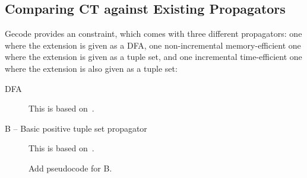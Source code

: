 \documentclass[a4paper,11pt]{article}
\newcommand{\Todo}[1]{{\color{blue}#1}}
\newcommand{\Algoref}[1]{Algorithm~\ref{#1}}
\numberwithin{equation}{section}
\begin{document}
\subsection{Comparing CT against Existing Propagators}

Gecode provides an  constraint, which
comes with three different propagators: one where the extension
is given as a DFA, one non-incremental memory-efficient one where
the extension is given as a tuple set, and one incremental
time-efficient one where the extension is also given as a tuple set:

\begin{description}
  \item[DFA] This is based on~\cite{Pesant:seqs}.
  \item[B -- Basic positive tuple set propagator]
    This is based on~\cite{DBLP:journals/ai/BessiereRYZ05}.

    \Todo{Add pseudocode for B}.





\end{description}
\end{document}

